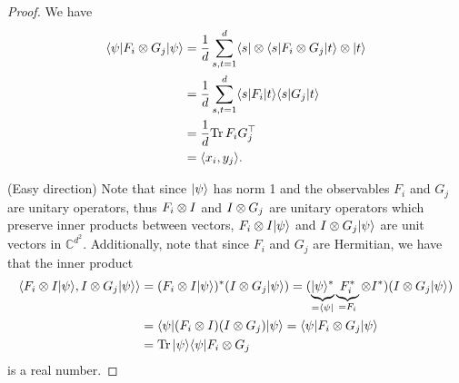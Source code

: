 \begin{proof}
		We have
		\begin{align*}
			\langle {\psi} \vert F_i\otimes G_j \vert {\psi} \rangle &= \frac{1}{d} \sum_{s,t=1}^d \langle {s} \vert\otimes\langle {s} \vert F_i\otimes G_j \vert {t} \rangle\otimes \vert {t} \rangle \\
			&= \frac{1}{d} \sum_{s,t=1}^d \langle {s} \vert F_i \vert {t} \rangle \langle {s} \vert G_j \vert {t} \rangle \\
			&= \frac{1}{d} \textup{Tr} \, {F_iG_j^\top} \\
			&= \langle{x_i},{y_j}\rangle.
		\end{align*}
		
		(Easy direction) Note that since $\vert {\psi} \rangle$ has norm 1 and the observables $F_i$ and $G_j$ are unitary operators, thus $F_i\otimes I$ and $I\otimes G_j$ are unitary operators which preserve inner products between vectors, $F_i\otimes I \vert {\psi} \rangle$ and $I\otimes G_j\vert {\psi} \rangle$ are unit vectors in $\mathbb{C}^{d^2}$. Additionally, note that since $F_i$ and $G_j$ are Hermitian, we have that the inner product
		\begin{align*}
			\sclr{F_i\tensor I \dr{\psi}}{I\tensor G_j \dr{\psi}} &= (F_i\tensor I \dr{\psi})^\ast(I\tensor G_j \dr{\psi}) 
			= (\underbrace{\dr{\psi}^\ast}_{=\dl{\psi}}\underbrace{F_i^\ast}_{=F_i}\tensor I^\ast)(I\tensor G_j \dr{\psi}) \\
			&= \dl{\psi}(F_i\tensor I)(I \tensor G_j) \dr{\psi}	%
			= \dl{\psi} F_i\tensor G_j \dr{\psi}\\
			&=\trace{\dr{\psi}\dl{\psi}F_i\tensor G_j}
		\end{align*}
		is a real number.
%		

\end{proof}
